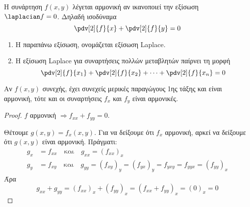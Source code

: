     \begin{dfn}
      Η συνάρτηση $ f(x,y) $ λέγεται \textcolor{Col1}{αρμονική} αν ικανοποιεί την εξίσωση 
      $ \laplacian f = 0 $. Δηλαδή ισοδύναμα 
      \[
        \pdv[2]{f}{x} + \pdv[2]{f}{y} = 0  
      \]
    \end{dfn}

    \begin{rem}
    \item {}
      \begin{enumerate}
        \item Η παραπάνω εξίσωση, ονομάζεται \textcolor{Col1}{εξίσωση Laplace}.
        \item Η εξίσωση Laplace για συναρτήσεις πολλών μεταβλητών παίρνει τη 
          μορφή
          \[
            \pdv[2]{f}{x_{1}} + \pdv[2]{f}{x_{2}} + \cdots + 
            \pdv[2]{f}{x_{n}}=0 
          \] 
      \end{enumerate}
    \end{rem}

    \begin{prop}
    \item {}
      Αν $ f(x,y) $ συνεχής, έχει συνεχείς μερικές παραγώγους 1ης τάξης 
      και είναι αρμονική, τότε και οι συναρτήσεις $ f_{x} $ και $ f_{y} $
      είναι αρμονικές. 
    \end{prop}
    \begin{proof}
    \item {}
      $f$ αρμονική $ \Rightarrow f_{xx}+f_{yy}=0 $.

      Θέτουμε $ g(x,y)=f_{x}(x,y) $. Για να δείξουμε ότι $ f_{x} $ αρμονική, 
      αρκεί να δείξουμε ότι $ g(x,y) $ είναι αρμονική. Πράγματι:
      \begin{align*}
        g_{x} &= f_{xx} \quad \text{και} \quad g_{xx} = (f_{xx})_{x} \\ 
        g_{y} &= f_{xy} \quad \text{και} \quad g_{yy} = (f_{xy})_{y} =
        (f_{yx})_{y} = f_{yxy} = f_{yyx} = (f_{yy})_{x}
      \end{align*}
      Άρα 
      \[
        g_{xx}+g_{yy} = (f_{xx})_{x} + (f_{yy})_{x} = 
        (f_{xx}+f_{yy})_{x}= (0)_{x} =0
      \] 
    \end{proof}

